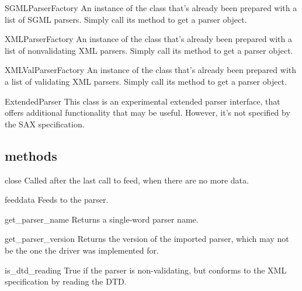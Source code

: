 \documentclass{howto}
\begin{document}
\begin{datadesc}{SGMLParserFactory}
An instance of the  class that's already been
prepared with a list of SGML parsers.  Simply call its
 method to get a parser object. 
\end{datadesc}

\begin{datadesc}{XMLParserFactory}
An instance of the  class that's already been
prepared with a list of nonvalidating XML parsers.  Simply call its
 method to get a parser object. 
\end{datadesc}

\begin{datadesc}{XMLValParserFactory}
An instance of the  class that's already been
prepared with a list of validating XML parsers.  Simply call its
 method to get a parser object. 
\end{datadesc}

\begin{classdesc}{ExtendedParser}{}
This class is an experimental extended parser interface, that offers
additional functionality that may be useful.  However, it's not
specified by the SAX specification.
\end{classdesc}

\subsection{ methods}

\begin{methoddesc}{close}{}
Called after the last call to feed, when there are no more data.
\end{methoddesc}

\begin{methoddesc}{feed}{data}
Feeds  to the parser.
\end{methoddesc}

\begin{methoddesc}{get_parser_name}{}
Returns a single-word parser name.
\end{methoddesc}

\begin{methoddesc}{get_parser_version}{}
Returns the version of the imported parser, which may not be the
one the driver was implemented for.
\end{methoddesc}

\begin{methoddesc}{is_dtd_reading}{}
True if the parser is non-validating, but conforms to the XML
specification by reading the DTD.
\end{methoddesc}
\end{document}
